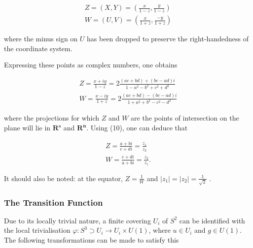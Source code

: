 \documentclass[fleqn, twocolumn, 10pt]{article}
\begin{document}
\begin{ceqn}
\begin{align*}
Z = (X, Y) = \left(\frac{x}{1-z}, \frac{y}{1-z}\right)\\
W = (U, V) = \left(\frac{x}{1+z}, \frac{-y}{1+z}\right)
\end{align*}
\end{ceqn}
where the minus sign on $U$ has been dropped to preserve the right-handedness of the coordinate system. 

Expressing these points as complex numbers, one obtains

\begin{ceqn}
\begin{align*}
Z = \frac{x+iy}{1-z} = 2\frac{(ac+bd)+(bc-ad)i}{1-a^2 -b^2 + c^2 +d^2}\\
W = \frac{x-iy}{1+z} = 2\frac{(ac+bd)-(bc-ad)i}{1+a^2+b^2-c^2-d^2}
\end{align*}
\end{ceqn}
where the projections for which $Z$ and $W$ are the points of intersection on the plane will lie in $\mathbf{R^s}$ and $\mathbf{R^n}$. Using (10), one can deduce that 

\begin{ceqn}
\begin{align*}
Z = \frac{a+bi}{c+di} = \frac{z_1}{z_2}\;\\
W  = \frac{c+di}{a+bi} = \frac{z_2}{z_1}.
\end{align*}
\end{ceqn}
It should also be noted: at the equator, $Z = \frac{1}{W}$ and $\rvert z_1\rvert = \rvert z_2\rvert = \frac{1}{\sqrt{2}}$ \cite{shnir, nakahara2003geometry}.


\subsubsection{The Transition Function}

Due to its locally trivial nature, a finite covering $U_i$ of $S^2$ can be identified with the local trivialisation $\varphi: S^3 \supset U_i \to U_i \times U(1)$, where $u \in U_i$ and $g \in U(1)$. The following transformations can be made to satisfy this 
\end{document}
